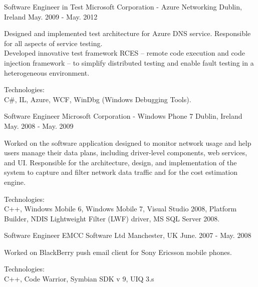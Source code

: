 \begin{cventries}

\cventry
{Software Engineer in Test} %
{Microsoft Corporation - Azure Networking} %
{Dublin, Ireland} %
{May. 2009 - May. 2012} %
{
  \begin{cvitems} %
    \item
    {
      Designed and implemented test architecture for Azure DNS service.
      Responsible for all aspects of service testing. \\
      Developed innovative test framework RCES – remote code execution and code injection framework – 
      to simplify distributed testing and enable fault testing in a heterogeneous environment.
    }
    \item
    {
      Technologies: \\
      {C\#}, IL, Azure, WCF, WinDbg (Windows Debugging Tools). \\
    }
  \end{cvitems}
}

\cventry
{Software Engineer} %
{Microsoft Corporation - Windows Phone 7} %
{Dublin, Ireland} %
{May. 2008 - May. 2009} %
{
  \begin{cvitems} %
    \item
    {
      Worked on the software application designed to monitor network usage and help users manage their data plans, including driver-level components, web services, and UI.
      Responsible for the architecture, design, and implementation of the system to capture and filter network data traffic and for the cost estimation engine.
    }
    \item
    {
      Technologies:\\
      C++, Windows Mobile 6, Windows Mobile 7, Visual Studio 2008, Platform Builder, NDIS Lightweight Filter (LWF) driver, MS SQL Server 2008. \\
    }
  \end{cvitems}
}

\cventry
{Software Engineer} %
{EMCC Software Ltd} %
{Manchester, UK} %
{June. 2007 - May. 2008} %
{
  \begin{cvitems} %
    \item
    {
      Worked on BlackBerry push email client for Sony Ericsson mobile phones.
    }
    \item
    {
      Technologies:\\
      C++, Code Warrior, Symbian SDK v 9, UIQ 3.s \\
    }
  \end{cvitems}
}


\end{cventries}

